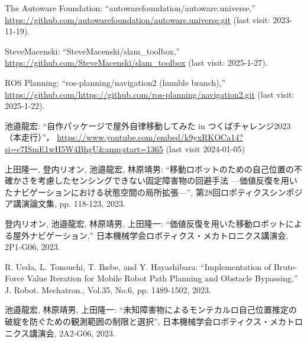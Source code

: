 \documentclass[twocolumn,9pt]{jsproceedings}
\begin{document}
\begin{thebibliography}{99}
  The Autoware Foundation: ``autowarefoundation/autoware.universe,'' \url{https://github.com/autowarefoundation/autoware.universe.git} (last visit: 2023-11-19).

  SteveMacenski: ``SteveMacenski/slam\_toolbox,'' \url{https://github.com/SteveMacenski/slam_toolbox} (last visit: 2025-1-27).

  ROS Planning: ``ros-planning/navigation2 (humble branch),'' \url{https://github.com/https://github.com/ros-planning/navigation2.git} (last visit: 2025-1-22).


  池邉龍宏: ``自作パッケージで屋外自律移動してみた in つくばチャレンジ2023（本走行）''，
  \url{https://www.youtube.com/embed/k9yxRKOCa14?si=c7ISmE1wH5W4BhgU&amp;start=1365} (last visit 2024-01-05)

上田隆一, 登内リオン, 池邉龍宏, 林原靖男: ``移動ロボットのための自己位置の不確かさを考慮したセンシングできない固定障害物の回避手法 ---価値反復を用いたナビゲーションにおける状態空間の局所拡張---'', 第28回ロボティクスシンポジア講演論文集, pp. 118-123, 2023.

  登内リオン, 池邉龍宏, 林原靖男, 上田隆一: ``価値反復を用いた移動ロボットによる屋外ナビゲーション,''
  日本機械学会ロボティクス・メカトロニクス講演会, 2P1-G06, 2023.

  R. Ueda, L. Tonouchi, T. Ikebe, and Y. Hayashibara: ``Implementation of Brute-Force Value Iteration for Mobile Robot Path Planning and Obstacle Bypassing,''
  J. Robot. Mechatron., Vol.35, No.6, pp. 1489-1502, 2023.

  池邉龍宏, 林原靖男, 上田隆一: ``未知障害物によるモンテカルロ自己位置推定の破綻を防ぐための観測範囲の制限と選択'',
  日本機械学会ロボティクス・メカトロニクス講演会, 2A2-G06, 2023.
\end{thebibliography}
\normalsize

\clearpage

\end{document}
